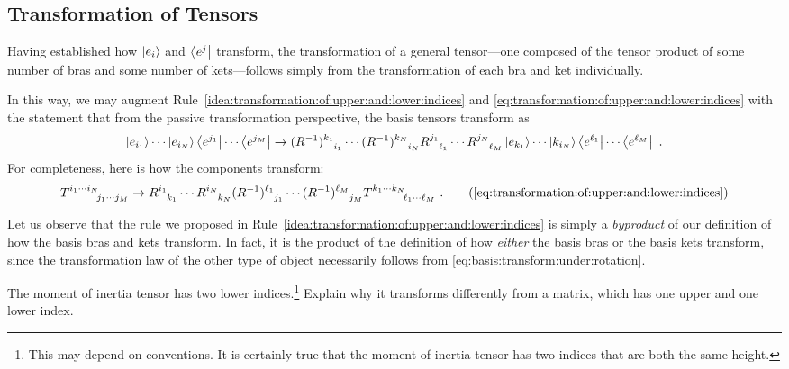 \subsection{Transformation of Tensors}

Having established how $\left|e_i\right\rangle$ and $\left\langle e^j\right|$ transform, the transformation of a general tensor---one composed of the tensor product of some number of bras and some number of kets---follows simply from the transformation of each bra and ket individually.

\begin{wide}
In this way, we may augment Rule~\ref{idea:transformation:of:upper:and:lower:indices} and \eqref{eq:transformation:of:upper:and:lower:indices} with the statement that from the passive transformation perspective, the basis tensors transform as
\begin{align}
    \ket{e_{i_1}} \cdots \ket{e_{i_N}}
    \bra{e^{j_1}} \cdots \bra{e^{j_M}}
    \to 
    (R\inv)\aij{k_1}{i_1}\cdots (R\inv)\aij{k_N}{i_N}
    R\aij{j_1}{\ell_1}\cdots R\aij{j_N}{\ell_M}
    \ket{e_{k_1}} \cdots \ket{k_{i_N}}
    \bra{e^{\ell_1}} \cdots \bra{e^{\ell_M}} \ .
\end{align}
For completeness, here is how the components transform:
\begin{align}
    T\aij{i_1\cdots i_N}{j_1\cdots j_M}
    \to 
    R\aij{i_1}{k_1}\cdots R\aij{i_N}{k_N}
    (R\inv)\aij{\ell_1}{j_1}\cdots (R\inv)\aij{\ell_M}{j_M}
    T\aij{k_1\cdots k_N}{\ell_1\cdots \ell_M} \ .
    \tag{\ref{eq:transformation:of:upper:and:lower:indices}}
\end{align}
\end{wide}

Let us observe that the rule we proposed in Rule~\ref{idea:transformation:of:upper:and:lower:indices} is simply a \emph{byproduct} of our definition of how the basis bras and kets transform. In fact, it is the product of the definition of how \emph{either} the basis bras or the basis kets transform, since the transformation law of the other type of object necessarily follows from \eqref{eq:basis:transform:under:rotation}.

\begin{example}
The moment of inertia tensor has two lower indices.\footnote{This may depend on conventions. It is certainly true that the moment of inertia tensor has two indices that are both the same height.} Explain why it transforms differently from a matrix, which has one upper and one lower index.
\end{example}

